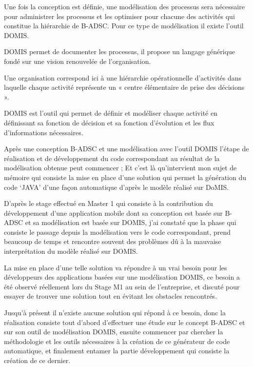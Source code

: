 \documentclass[a4paper,12pt]{article}
\begin{document}
Une fois la conception est définie, une modélisation des processus sera nécessaire pour administrer les processus et les optimiser pour chacune des activités qui constitue la hiérarchie de B-ADSC.
Pour ce type de modélisation il existe l’outil DOMIS.

DOMIS permet de documenter les processus, il propose un langage générique fondé sur une vision renouvelée de l’organisation.

Une organisation correspond ici à une hiérarchie opérationnelle d’activités dans laquelle chaque activité représente un « centre élémentaire de prise des décisions ».

DOMIS est l’outil qui permet de définir et modéliser chaque activité en définissant sa fonction de décision et sa fonction d’évolution et les flux d’informations nécessaires.

\vspace{0,5cm}

Après une conception B-ADSC et une modélisation avec l’outil DOMIS l’étape de réalisation et de développement du code correspondant au résultat de la modélisation obtenue peut commencer ; Et c’est là qu’intervient mon sujet de mémoire qui consiste la mise en place d’une solution qui permet la génération du code ‘JAVA’ d’une façon automatique d’après le modèle réalisé sur DoMIS.

\vspace{0,5cm}

D’après le stage effectué en Master 1 qui consiste à la contribution du développement d’une application mobile dont sa conception est basée sur B-ADSC et sa modélisation est basée sur DOMIS, j’ai constaté que la phase qui consiste le passage depuis la modélisation vers le code correspondant, prend beaucoup de temps et rencontre souvent des problèmes dû à la mauvaise interprétation du modèle réalisé sur DOMIS.

La mise en place d’une telle solution va répondre à un vrai besoin pour les développeurs des applications basées sur une modélisation DOMIS, ce besoin a été observé réellement lors du Stage M1 au sein de l’entreprise, et discuté pour essayer de trouver une solution tout en évitant les obstacles rencontrés.

\vspace{0,5cm}

Jusqu’à présent il n’existe aucune solution qui répond à ce besoin, donc la réalisation consiste tout d’abord d'effectuer une étude sur le concept B-ADSC et sur son outil de modélisation DOMIS, ensuite commencer par chercher la méthodologie et les outils nécessaires à la création de ce générateur de code automatique, et finalement entamer la partie développement qui consiste la création de ce dernier.
\end{document}

